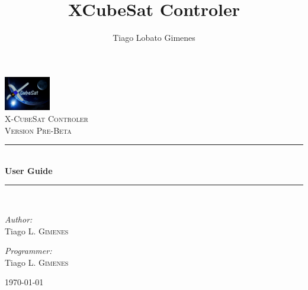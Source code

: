 \documentclass[pdftex,11pt,a4paper,titlepage]{report}
\author{Tiago Lobato Gimenes}
\title{XCubeSat Controler}
\newcommand{\HRule}{\rule{\linewidth}{0.5mm}}
\begin{document}
\begin{titlepage}
\begin{center}

\includegraphics[width=0.15\textwidth]{../images/CubeSat3.jpg}~\\[1cm]

\textsc{\LARGE X-CubeSat Controler}\\[1.5cm]

\textsc{\Large Version Pre-Beta}\\[0.5cm]

\HRule \\[0.4cm]
{ \huge \bfseries User Guide \\[0.4cm] }

\HRule \\[1.5cm]

\begin{minipage}{0.4\textwidth}
\begin{flushleft} \large
\emph{Author:}\\
Tiago \textsc{L. Gimenes}
\end{flushleft}
\end{minipage}
\begin{minipage}{0.4\textwidth}
\begin{flushright} \large
\emph{Programmer:} \\
Tiago \textsc{L. Gimenes}
\end{flushright}
\end{minipage}

\vfill

{\large \today}

\end{center}
\end{titlepage}


\end{document}
